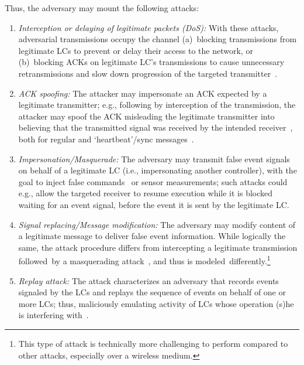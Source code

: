 Thus, the adversary may mount the following attacks:
\begin{enumerate}
  \item \emph{Interception or delaying of legitimate packets (DoS):} With these attacks, adversarial transmissions occupy the channel (a)~blocking transmissions %
  from legitimate LCs to prevent or delay their access to the network, %
  or (b)~blocking ACKs on legitimate LC's transmissions to cause unnecessary retransmissions and slow down progression of the targeted transmitter~\cite{wirelessattack}.

  \item \emph{ACK spoofing:} The attacker may impersonate an ACK expected by a legitimate transmitter; e.g., following by interception of the transmission, the attacker may spoof the ACK misleading the legitimate transmitter into believing that the transmitted signal was received by the intended receiver~\cite{802.15.4auth}, both for regular and `heartbeat'/sync messages~\cite{ackattack1}.%

  \item \emph{Impersonation/Masquerade:} %
  The adversary may transmit false event signals on behalf of a legitimate LC (i.e., impersonating another controller), with the goal to inject false commands~\cite{802.15.4auth} or sensor measurements; such attacks could e.g., allow the targeted receiver to resume execution while it is blocked waiting for %
  an event signal, before the event %
   it is sent by the legitimate LC.

  \item \emph{Signal replacing/Message modification:} The adversary may modify content of a legitimate message %
  to deliver false event information. While logically the same, the attack procedure differs from intercepting a legitimate transmission followed~by a masquerading attack~\cite{ackattack2}, and thus is modeled~differently.\footnote{This type of attack is technically more challenging to perform compared to other attacks, especially over a wireless medium.}

  \item \emph{Replay attack:} The attack characterizes an adversary that records events signaled by the LCs and replays the sequence of events on behalf of one or more LCs; thus, maliciously emulating activity of LCs whose operation (s)he is interfering with~\cite{ackattack2}.%
\end{enumerate}

